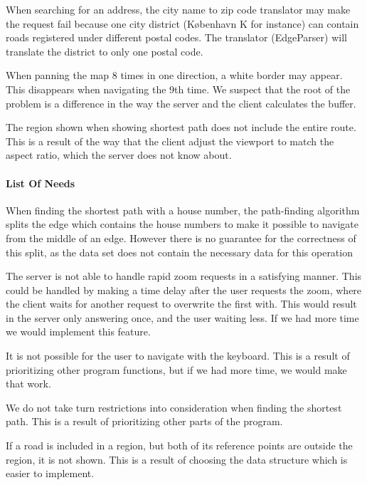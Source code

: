 \documentclass[a4paper,10pt,titlepage]{article}
\begin{document}
When searching for an address, the city name to zip code translator may make the request fail because one city district (K\o benhavn K for instance) can contain roads registered under different postal codes. The translator (EdgeParser) will translate the district to only one postal code.

When panning the map 8 times in one direction, a white border may appear. This disappears when navigating the 9th time. We suspect that the root of the problem is a difference in the way the server and the client calculates the buffer.

The region shown when showing shortest path does not include the entire route. This is a result of the way that the client adjust the viewport to match the aspect ratio, which the server does not know about.

		\paragraph{List Of Needs}\mbox{}
		
When finding the shortest path with a house number, the path-finding algorithm splits the edge which contains the house numbers to make it possible to navigate from the middle of an edge. However there is no guarantee for the correctness of this split, as the data set does not contain the necessary data for this operation

The server is not able to handle rapid zoom requests in a satisfying manner. This could be handled by making a time delay after the user requests the zoom, where the client waits for another request to overwrite the first with. This would result in the server only answering once, and the user waiting less. If we had more time we would implement this feature.\

It is not possible for the user to navigate with the keyboard. This is a result of prioritizing other program functions, but if we had more time, we would make that work.

We do not take turn restrictions into consideration when finding the shortest path. This is a result of prioritizing other parts of the program.

If a road is included in a region, but both of its reference points are outside the region, it is not shown. This is a result of choosing the data structure which is easier to implement.
		
		\newpage	
\end{document}
